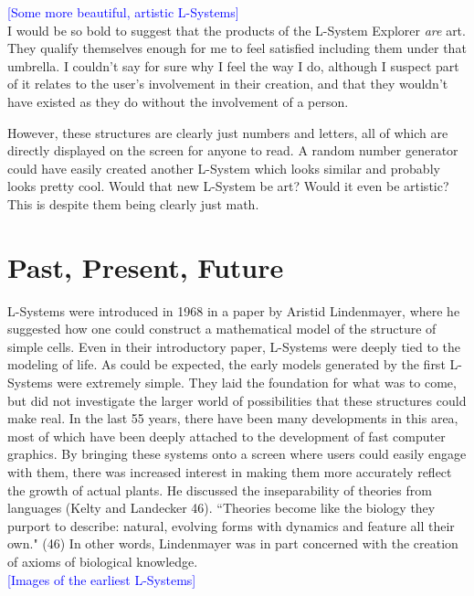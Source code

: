 \documentclass[12pt,twoside]{reedthesis}
\begin{document}
	\textcolor{blue}{[Some more beautiful, artistic L-Systems]}\\
	
	I would be so bold to suggest that the products of the L-System Explorer \textit{are} art. They qualify themselves enough for me to feel satisfied including them under that umbrella. I couldn't say for sure why I feel the way I do, although I suspect part of it relates to the user's involvement in their creation, and that they wouldn't have existed as they do without the involvement of a person.
	
	However, these structures are clearly just numbers and letters, all of which are directly displayed on the screen for anyone to read. A random number generator could have easily created another L-System which looks similar and probably looks pretty cool. Would that new L-System be art? Would it even be artistic? This is despite them being clearly just math.


\chapter{Past, Present, Future}

	L-Systems were introduced in 1968 in a paper by Aristid Lindenmayer, where he suggested how one could construct a mathematical model of the structure of simple cells. Even in their introductory paper, L-Systems were deeply tied to the modeling of life. As could be expected, the early models generated by the first L-Systems were extremely simple. They laid the foundation for what was to come, but did not investigate the larger world of possibilities that these structures could make real. In the last 55 years, there have been many developments in this area, most of which have been deeply attached to the development of fast computer graphics. By bringing these systems onto a screen where users could easily engage with them, there was increased interest in making them more accurately reflect the growth of actual plants. He discussed the inseparability of theories from languages (Kelty and Landecker 46). ``Theories become like the biology they purport to describe: natural, evolving forms with dynamics and feature all their own." (46) In other words, Lindenmayer was in part concerned with the creation of axioms of biological knowledge.\\
	
	\textcolor{blue}{[Images of the earliest L-Systems]}\\
	
\end{document}
